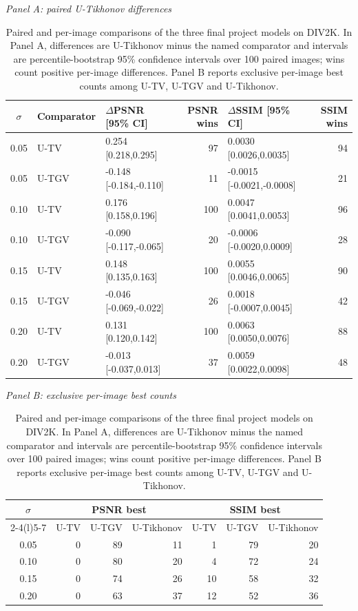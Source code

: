 \begin{table}[t]
\centering
\caption{Paired and per-image comparisons of the three final project models on DIV2K. In Panel A, differences are U-Tikhonov minus the named comparator and intervals are percentile-bootstrap 95\% confidence intervals over 100 paired images; wins count positive per-image differences. Panel B reports exclusive per-image best counts among U-TV, U-TGV and U-Tikhonov.}
\label{tab:project_paired_comparisons}
\scriptsize
\textit{Panel A: paired U-Tikhonov differences}\\[0.3em]
\begin{tabular}{@{}cllrlr@{}}
\toprule
$\sigma$ & Comparator & $\Delta$PSNR [95\% CI] & PSNR wins & $\Delta$SSIM [95\% CI] & SSIM wins \\
\midrule
0.05 & U-TV & 0.254 [0.218,0.295] & 97 & 0.0030 [0.0026,0.0035] & 94 \\
0.05 & U-TGV & -0.148 [-0.184,-0.110] & 11 & -0.0015 [-0.0021,-0.0008] & 21 \\
0.10 & U-TV & 0.176 [0.158,0.196] & 100 & 0.0047 [0.0041,0.0053] & 96 \\
0.10 & U-TGV & -0.090 [-0.117,-0.065] & 20 & -0.0006 [-0.0020,0.0009] & 28 \\
0.15 & U-TV & 0.148 [0.135,0.163] & 100 & 0.0055 [0.0046,0.0065] & 90 \\
0.15 & U-TGV & -0.046 [-0.069,-0.022] & 26 & 0.0018 [-0.0007,0.0045] & 42 \\
0.20 & U-TV & 0.131 [0.120,0.142] & 100 & 0.0063 [0.0050,0.0076] & 88 \\
0.20 & U-TGV & -0.013 [-0.037,0.013] & 37 & 0.0059 [0.0022,0.0098] & 48 \\
\bottomrule
\end{tabular}
\vspace{0.7em}
\textit{Panel B: exclusive per-image best counts}\\[0.3em]
\begin{tabular}{@{}crrrrrr@{}}
\toprule
$\sigma$ & \multicolumn{3}{c}{PSNR best} & \multicolumn{3}{c}{SSIM best} \\
\cmidrule(lr){2-4}\cmidrule(l){5-7}
 & U-TV & U-TGV & U-Tikhonov & U-TV & U-TGV & U-Tikhonov \\
\midrule
0.05 & 0 & 89 & 11 & 1 & 79 & 20 \\
0.10 & 0 & 80 & 20 & 4 & 72 & 24 \\
0.15 & 0 & 74 & 26 & 10 & 58 & 32 \\
0.20 & 0 & 63 & 37 & 12 & 52 & 36 \\
\bottomrule
\end{tabular}
\end{table}
